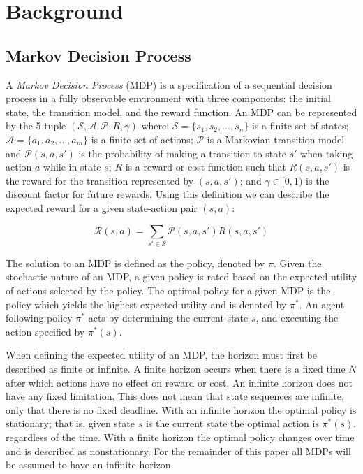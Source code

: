 \chapter{Background}

\section{Markov Decision Process}

A \emph{Markov Decision Process} (MDP) \cite{norvig} is a specification of a sequential decision process in a fully observable environment with three components: the initial state, the transition model, and the reward function. An MDP can be represented by the 5-tuple $(\mathcal{S, A, P}, R, \gamma)$ where: $\mathcal{S} = \{s_1, s_2, ..., s_n\}$ is a finite set of states; $\mathcal{A} = \{a_1, a_2, ..., a_m\}$ is a finite set of actions; $\mathcal{P}$ is a Markovian transition model and $\mathcal{P}(s, a, s')$ is the probability of making a transition to state $s'$ when taking action $a$ while in state $s$; $R$ is a reward or cost function such that $R(s, a, s')$ is the reward for the transition represented by $(s, a, s')$; and $\gamma \in [0, 1)$ is the discount factor for future rewards. Using this definition we can describe the expected reward for a given state-action pair $(s, a)$:

\[
    \mathcal{R}(s, a) = \sum_{s' \in \mathcal{S}} \mathcal{P}(s, a, s')R(s, a, s')
\]

The solution to an MDP is defined as the policy, denoted by $\pi$. Given the stochastic nature of an MDP, a given policy is rated based on the expected utility of actions selected by the policy. The optimal policy for a given MDP is the policy which yields the highest expected utility and is denoted by $\pi^*$. An agent following policy $\pi^*$ acts by determining the current state $s$, and executing the action specified by $\pi^*(s)$.

When defining the expected utility of an MDP, the horizon must first be described as finite or infinite. A finite horizon occurs when there is a fixed time $N$ after which actions have no effect on reward or cost. An infinite horizon does not have any fixed limitation. This does not mean that state sequences are infinite, only that there is no fixed deadline. With an infinite horizon the optimal policy is stationary; that is, given state $s$ is the current state the optimal action is $\pi^*(s)$, regardless of the time. With a finite horizon the optimal policy changes over time and is described as nonstationary. For the remainder of this paper all MDPs will be assumed to have an infinite horizon.

